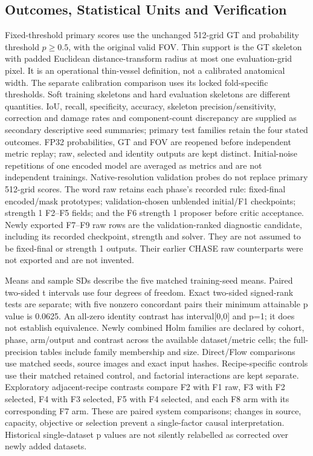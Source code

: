 \documentclass[jimaging,article,submit,pdftex,moreauthors]{Definitions/mdpi}
\begin{document}
\subsection{Outcomes, Statistical Units and Verification}
Fixed-threshold primary scores use the unchanged 512-grid GT and probability threshold
$p\geq 0.5$, with the original valid FOV. Thin support is the GT skeleton with
padded Euclidean distance-transform radius at most one evaluation-grid pixel.
It is an operational thin-vessel definition, not a calibrated anatomical width.
The separate calibration comparison uses its locked fold-specific thresholds.
Soft training skeletons and hard evaluation skeletons are different quantities.
IoU, recall, specificity, accuracy, skeleton precision/sensitivity, correction
and damage rates and component-count discrepancy are supplied as secondary
descriptive seed summaries; primary test families retain the four stated outcomes.
FP32 probabilities, GT and FOV are reopened before independent metric replay;
raw, selected and identity outputs are kept distinct. Initial-noise repetitions
of one encoded model are averaged as metrics and are not independent trainings.
Native-resolution validation probes do not replace primary 512-grid scores.
The word raw retains each phase's recorded rule: fixed-final encoded/mask
prototypes; validation-chosen unblended initial/F1 checkpoints; strength 1
F2--F5 fields; and the F6 strength 1 proposer before critic acceptance. Newly
exported F7--F9 raw rows are the validation-ranked diagnostic candidate,
including its recorded checkpoint, strength and solver. They are not assumed
to be fixed-final or strength 1 outputs. Their earlier CHASE raw counterparts
were not exported and are not invented.

Means and sample SDs describe the five matched training-seed means. Paired
two-sided t intervals use four degrees of freedom. Exact two-sided signed-rank
tests are separate; with five nonzero concordant pairs their minimum attainable
p value is 0.0625. An all-zero identity contrast has interval[0,0] and p=1;
it does not establish equivalence. Newly combined Holm families are declared by
cohort, phase, arm/output and contrast across the available dataset/metric cells;
the full-precision tables include family membership and size. Direct/Flow
comparisons use matched seeds, source images and exact input hashes.
Recipe-specific controls use their matched retained control, and factorial
interactions are kept separate. Exploratory adjacent-recipe contrasts compare
F2 with F1 raw, F3 with F2 selected, F4 with F3 selected, F5 with F4 selected,
and each F8 arm with its corresponding F7 arm. These are paired system
comparisons; changes in source, capacity, objective or selection prevent a
single-factor causal interpretation. Historical single-dataset p values are not
silently relabelled as corrected over newly added datasets.
\end{document}
